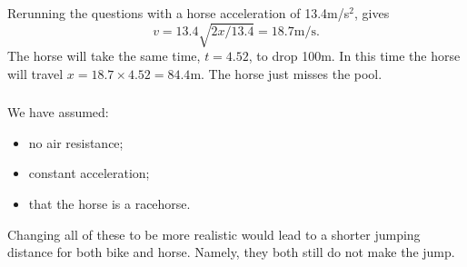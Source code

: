 \documentclass[10pt]{article}
\newcommand{\bb}{\begin{equation}}
\newcommand{\ee}{\end{equation}}
\begin{document}
\begin{Answ}
\subsubsection{}
Rerunning the questions with a horse acceleration of 13.4m/s$^2$, gives
\bb
v=13.4\sqrt{2x/13.4}=18.7\textrm{m/s}.
\ee
The horse will take the same time, $t=4.52$, to drop 100m. In this time the horse will travel $x=18.7\times 4.52=84.4$m. The horse just misses the pool.
\subsubsection{}
We have assumed:
\begin{itemize}
\item no air resistance;
\item constant acceleration;
\item that the horse is a racehorse.
\end{itemize}
Changing all of these to be more realistic would lead to a shorter jumping distance for both bike and horse. Namely, they both still do not make the jump.
%
\end{Answ}
\end{document}
